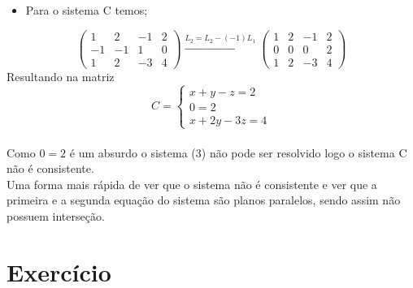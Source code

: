 \documentclass{article}
\begin{document}
      \begin{itemize}
          \item Para o sistema C temos;
      \end{itemize}
    \begin{equation*}\begin{pmatrix}
      1 & 2 & -1 &2 \\ 
       -1& -1 &  1& 0\\ 
       1&  2&  -3& 4
      \end{pmatrix}
      \xrightarrow[]{L_2=L_2 - (-1)L_1} 
      \begin{pmatrix}
      1 & 2 & -1 &2 \\ 
       0& 0 &  0& 2\\ 
       1&  2&  -3& 4
      \end{pmatrix}\end{equation*}
 Resultando na matriz
\begin{equation}
  C = \left\{\begin{matrix}  x + y - z = 2 \\ 0 = 2 \\ x+2y-3z=4 \end{matrix}\right.
\end{equation} 
\\
Como $0=2$ é um absurdo o sistema (3) não pode ser resolvido logo o sistema C não é consistente.\\
Uma forma mais rápida de ver que o sistema não é consistente e ver que a primeira e a segunda equação do sistema são planos paralelos, sendo assim não possuem interseção.

\section{Exercício}
\end{document}
